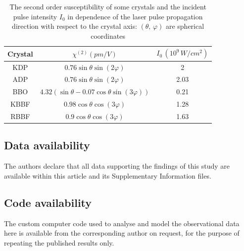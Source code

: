 \documentclass[a4paper, 12pt, onecolumn]{extarticle}
\begin{document}
\begin{table}
\caption{The second order susceptibility of some crystals and the incident pulse intensity $I_0$ in dependence of the laser pulse propagation direction with respect to the crystal axis: \((\theta,\,\varphi)\) are spherical coordinates }
{\begin{tabular}{|c|c|c|} 
\hline
Crystal& $\chi^{(2)} (pm/V)$ & $ I_0\,(10^9\,W/cm^2)$ \\
\hline
KDP \cite{bib:c4}& $0.76\sin\theta\sin(2\varphi)$ & 2 \\
\hline
ADP \cite{bib:c4}& $0.76\sin\theta\sin(2\varphi)$ & 2.03 \\
\hline
BBO \cite{bib:c4}& $4.32(\sin\theta-0.07\cos\theta\sin(3\varphi))$ & 0.21 \\
\hline
KBBF \cite{bib:c5}& $0.98\cos\theta\cos(3\varphi)$ & 1.28 \\
\hline
RBBF \cite{bib:c3}& $0.9\cos\theta\cos(3\varphi)$ & 1.63 \\
\hline
\end{tabular}
\label{tab:3}}
\end{table}

\subsection*{Data availability}
The authors declare that all data supporting the findings of this study are available
within this article and its Supplementary Information files.

\subsection*{Code availability}
The custom computer code used to analyse and model the observational data here is available from the corresponding author on request, for the purpose of repeating 
the published results only.
\end{document}
